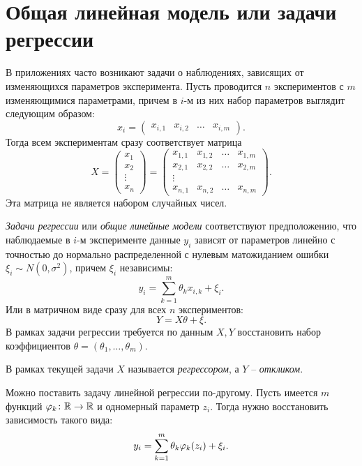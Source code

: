 \section{Общая линейная модель или задачи регрессии}

В приложениях часто возникают задачи о наблюдениях, зависящих от изменяющихся
параметров эксперимента. Пусть проводится $n$ экспериментов с $m$ изменяющимися
параметрами, причем в $i$-м из них набор параметров выглядит следующим образом:
\[
    x_i = \begin{pmatrix}
        x_{i, 1} & x_{i, 2} & \ldots & x_{i, m}
    \end{pmatrix}
.\]
Тогда всем экспериментам сразу соответствует матрица
\[
    X = \begin{pmatrix}
        x_1 \\
        x_2 \\
        \vdots \\
        x_n
    \end{pmatrix} = \begin{pmatrix}
        x_{1, 1} & x_{1, 2} & \ldots & x_{1, m} \\
        x_{2, 1} & x_{2, 2} & \ldots & x_{2, m} \\
        \vdots \\
        x_{n, 1} & x_{n, 2} & \ldots & x_{n, m}
    \end{pmatrix}
.\]
Эта матрица не является набором случайных чисел.

\begin{definition}
    \textit{Задачи регрессии} или \textit{общие линейные модели} соответствуют
    предположению, что наблюдаемые в $i$-м эксперименте данные $y_i$ зависят 
    от параметров линейно с точностью до нормально распределенной с нулевым
    матожиданием ошибки $\xi_i \sim N(0, \sigma^2)$, причем $\xi_i$ независимы:
    \[
        y_i = \sum_{k = 1}^{m}{\theta_k x_{i, k}} + \xi_i
    .\]
    Или в матричном виде сразу для всех $n$ экспериментов:
    \[
        Y = X \theta + \xi
    .\]
    В рамках задачи регрессии требуется по данным $X, Y$ восстановить набор
    коэффициентов $\theta = (\theta_1, \ldots, \theta_m)$.
\end{definition}

\begin{definition}
    В рамках текущей задачи $X$ называется \textit{регрессором}, а
    $Y$ --  \textit{откликом}.
\end{definition}

\begin{definition}
    Можно поставить задачу линейной регрессии по-другому. Пусть имеется
    $m$ функций $\varphi_k \colon \mathbb{R} \to \mathbb{R}$ и одномерный параметр $z_i$. Тогда
    нужно восстановить зависимость такого вида:
    \[
        y_i = \sum_{k = 1}^{m}{\theta_k \varphi_k(z_i)} + \xi_i
    .\]
\end{definition}

